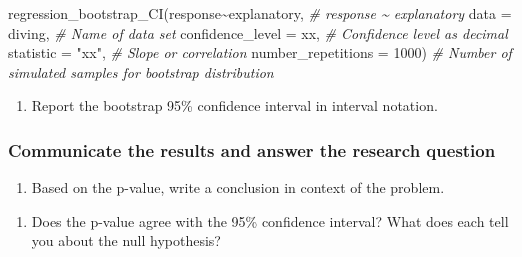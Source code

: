 \documentclass[
]{report}
\newenvironment{Shaded}{\begin{snugshade}}{\end{snugshade}}
\newcommand{\AttributeTok}[1]{\textcolor[rgb]{0.77,0.63,0.00}{#1}}
\newcommand{\CommentTok}[1]{\textcolor[rgb]{0.56,0.35,0.01}{\textit{#1}}}
\newcommand{\DecValTok}[1]{\textcolor[rgb]{0.00,0.00,0.81}{#1}}
\newcommand{\FunctionTok}[1]{\textcolor[rgb]{0.00,0.00,0.00}{#1}}
\newcommand{\NormalTok}[1]{#1}
\newcommand{\SpecialCharTok}[1]{\textcolor[rgb]{0.00,0.00,0.00}{#1}}
\newcommand{\StringTok}[1]{\textcolor[rgb]{0.31,0.60,0.02}{#1}}
\providecommand{\tightlist}{%
  \setlength{\itemsep}{0pt}\setlength{\parskip}{0pt}}
\begin{document}
\begin{Shaded}
\begin{Highlighting}[]
\FunctionTok{regression\_bootstrap\_CI}\NormalTok{(response}\SpecialCharTok{\textasciitilde{}}\NormalTok{explanatory, }\CommentTok{\# response \textasciitilde{} explanatory}
   \AttributeTok{data =}\NormalTok{ diving, }\CommentTok{\# Name of data set}
   \AttributeTok{confidence\_level =}\NormalTok{ xx, }\CommentTok{\# Confidence level as decimal}
   \AttributeTok{statistic =} \StringTok{"xx"}\NormalTok{, }\CommentTok{\# Slope or correlation}
   \AttributeTok{number\_repetitions =} \DecValTok{1000}\NormalTok{) }\CommentTok{\# Number of simulated samples for bootstrap distribution}
\end{Highlighting}
\end{Shaded}

\begin{enumerate}
\def\labelenumi{\arabic{enumi}.}
\setcounter{enumi}{11}
\tightlist
\item
  Report the bootstrap 95\% confidence interval in interval notation.\\
  \vspace{0.5in}
\end{enumerate}

\hypertarget{communicate-the-results-and-answer-the-research-question-4}{%
\subsubsection*{Communicate the results and answer the research question}\label{communicate-the-results-and-answer-the-research-question-4}}

\begin{enumerate}
\def\labelenumi{\arabic{enumi}.}
\setcounter{enumi}{12}
\tightlist
\item
  Based on the p-value, write a conclusion in context of the problem.
\end{enumerate}

\vspace{.8in}

\begin{enumerate}
\def\labelenumi{\arabic{enumi}.}
\setcounter{enumi}{13}
\tightlist
\item
  Does the p-value agree with the 95\% confidence interval? What does each tell you about the null hypothesis?
\end{enumerate}
\end{document}

